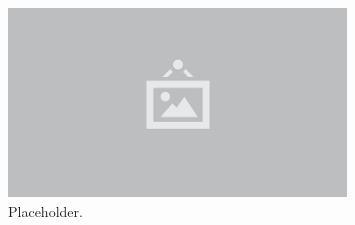 \begin{figure}
  \centering
  \includegraphics[width=0.8\textwidth]{./img/raw/placeholder.png}
  \caption{Placeholder.}
  \label{fig:placeholder}
\end{figure}
